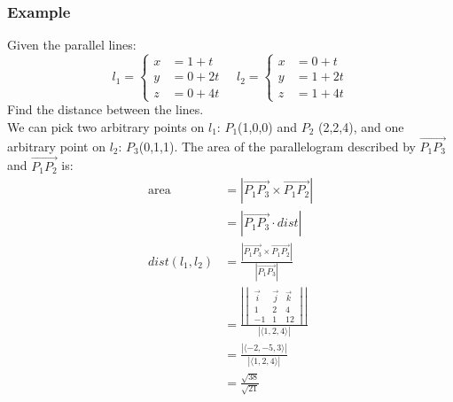 \documentclass{math}
\begin{document}
\subsubsection*{Example}
Given the parallel lines:
\[ l_1 = \begin{cases}
  x &= 1+t \\
  y &= 0+2t \\
  z &= 0+4t
\end{cases} \quad l_2 = \begin{cases}
  x &= 0+t \\
  y &= 1+2t \\
  z &= 1+4t
\end{cases} \]
Find the distance between the lines. \\
We can pick two arbitrary points on \( l_1 \): \( P_1 \)(1,0,0) and \( P_2 \)
(2,2,4), and one arbitrary point on \( l_2 \): \( P_3 \)(0,1,1). The area
of the parallelogram described by \( \overrightarrow{P_1P_3} \) and
\( \overrightarrow{P_1P_2} \) is:
\begin{align*}
  \text{area} &= |\overrightarrow{P_1P_3}\times\overrightarrow{P_1P_2}| \\
  &= |\overrightarrow{P_1P_3}\cdot dist| \\
  dist(l_1,l_2) &= \frac{|\overrightarrow{P_1P_3}\times\overrightarrow{P_1P_2}|}
    {|\overrightarrow{P_1P_3}|} \\
  &= \frac{\left|\begin{vmatrix}
    \vec{i} & \vec{j} & \vec{k} \\
    1 & 2 & 4 \\
    -1 & 1 & 12
  \end{vmatrix}\right|}{|\langle1,2,4\rangle|} \\
  &= \frac{|\langle-2,-5,3\rangle|}{|\langle1,2,4\rangle|} \\
  &= \frac{\sqrt{38}}{\sqrt{21}}
\end{align*}
\end{document}
